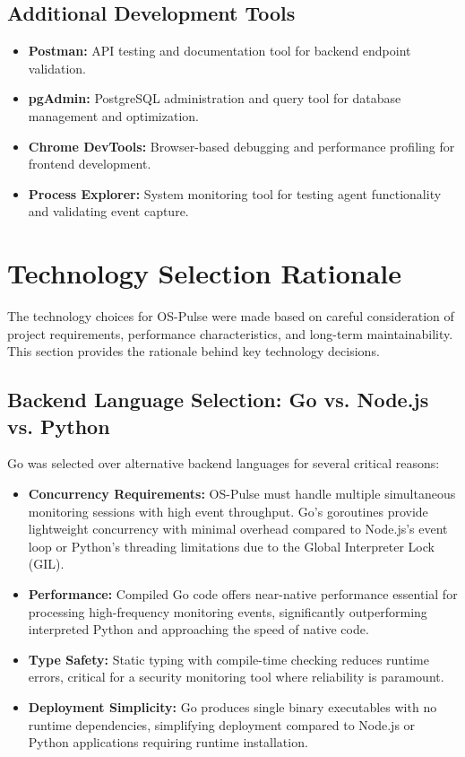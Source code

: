 \subsection{Additional Development Tools}

\begin{itemize}
    \item \textbf{Postman:} API testing and documentation tool for backend endpoint validation.
    \item \textbf{pgAdmin:} PostgreSQL administration and query tool for database management and optimization.
    \item \textbf{Chrome DevTools:} Browser-based debugging and performance profiling for frontend development.
    \item \textbf{Process Explorer:} System monitoring tool for testing agent functionality and validating event capture.
\end{itemize}

\section{Technology Selection Rationale}

The technology choices for OS-Pulse were made based on careful consideration of project requirements, performance characteristics, and long-term maintainability. This section provides the rationale behind key technology decisions.

\subsection{Backend Language Selection: Go vs. Node.js vs. Python}

Go was selected over alternative backend languages for several critical reasons:

\begin{itemize}
    \item \textbf{Concurrency Requirements:} OS-Pulse must handle multiple simultaneous monitoring sessions with high event throughput. Go's goroutines provide lightweight concurrency with minimal overhead compared to Node.js's event loop or Python's threading limitations due to the Global Interpreter Lock (GIL).
    \item \textbf{Performance:} Compiled Go code offers near-native performance essential for processing high-frequency monitoring events, significantly outperforming interpreted Python and approaching the speed of native code.
    \item \textbf{Type Safety:} Static typing with compile-time checking reduces runtime errors, critical for a security monitoring tool where reliability is paramount.
    \item \textbf{Deployment Simplicity:} Go produces single binary executables with no runtime dependencies, simplifying deployment compared to Node.js or Python applications requiring runtime installation.
\end{itemize}

